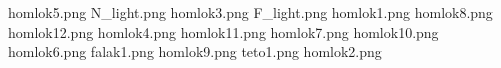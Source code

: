homlok5.png
N_light.png
homlok3.png
F_light.png
homlok1.png
homlok8.png
homlok12.png
homlok4.png
homlok11.png
homlok7.png
homlok10.png
homlok6.png
falak1.png
homlok9.png
teto1.png
homlok2.png
